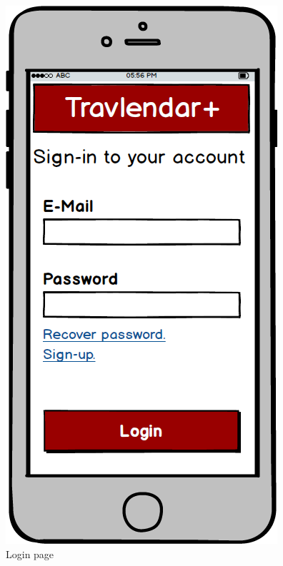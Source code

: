 \begin{figure}[!htb]
\begin{minipage}[b]{0.3\textwidth}
	\includegraphics[scale=0.3]{images/login}
	\caption{Login page}
	\label{ref:login}
\end{minipage}
\hfill
\begin{minipage}[b]{0.3\textwidth}
	\centering

\end{minipage}
\end{figure}
